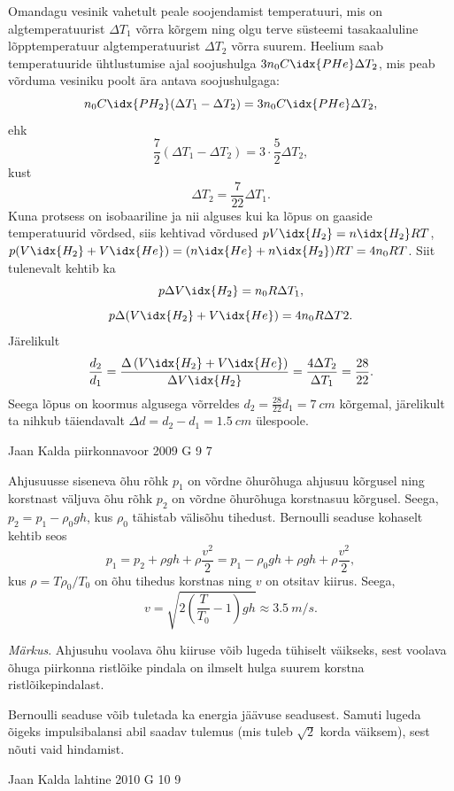 \documentclass[11pt]{article}
\begin{document}
{{Omandagu vesinik vahetult peale soojendamist temperatuuri, mis on algtemperatuurist $\Delta T_1$ võrra kõrgem ning olgu terve süsteemi tasakaaluline lõpptemperatuur algtemperatuurist $\Delta T_2$ võrra suurem. Heelium saab temperatuuride ühtlustumise ajal soojushulga $3n_0C\idx{PHe}\Delta T_2$, mis peab võrduma vesiniku poolt ära antava soojushulgaga:
\[
n_0C\idx{PH_2} (\Delta T_1 - \Delta T_2) = 3n_0C\idx{PHe}\Delta T_2,
\]
ehk
\[
\frac{7}{2} (\Delta T_1 - \Delta T_2) = 3 \cdot \frac{5}{2} \Delta T_2,
\]
kust
\[
\Delta T_2 = \frac{7}{22} \Delta T_1.
\]
Kuna protsess on isobaariline ja nii alguses kui ka lõpus on gaaside temperatuurid võrdsed, siis kehtivad võrdused $pV\idx{H_2} = n\idx{H_2}RT$, $p(V\idx{H_2} + V\idx{He}) = (n\idx{He} + n\idx{H_2} )RT = 4n_0RT$. Siit tulenevalt kehtib ka
\[
p\Delta V\idx{H_2} = n_0R\Delta T_1,
\]
\[
p\Delta (V\idx{H_2} + V\idx{He}) = 4n_0R\Delta T2.
\]
Järelikult
\[
\frac{d_{2}}{d_{1}}=\frac{\Delta\left(V\idx{H_{2}}+V\idx{H e}\right)}{\Delta V\idx{H_{2}}}=\frac{4 \Delta T_{2}}{\Delta T_{1}}=\frac{28}{22}.
\]
Seega lõpus on koormus algusega võrreldes $d_2 = \frac{28}{22} d_1 = \SI{7}{cm}$ kõrgemal, järelikult ta nihkub täiendavalt $\Delta d = d_2 - d_1 = \SI{1,5}{cm}$ ülespoole. 
\fi
}

{Jaan Kalda} %
{piirkonnavoor} %
{2009} %
{G 9} %
{7} %
{

\ifSolution
Ahjusuusse siseneva õhu rõhk $p_1$ on võrdne õhurõhuga ahjusuu kõrgusel ning korstnast väljuva õhu rõhk $p_2$ on võrdne õhurõhuga korstnasuu kõrgusel. Seega, $p_2=p_1-\rho_0 gh$, kus $\rho_0$ tähistab välisõhu tihedust. Bernoulli seaduse kohaselt kehtib seos 
\[
p_1=p_2 + \rho gh + \rho \frac{v^2}{2} = p_1 - \rho_0 gh + \rho gh+\rho \frac{v^2}{2},
\]
kus $\rho=T\rho_0/T_0$ on õhu tihedus korstnas ning $v$ on otsitav kiirus. Seega,
\[
v=\sqrt {2\left(\frac T{T_0}-1\right)gh}\approx \SI{3,5}{m/s}.
\]

\emph{Märkus}. Ahjusuhu voolava õhu kiiruse võib lugeda tühiselt väikseks, sest voolava õhuga piirkonna ristlõike pindala on ilmselt hulga suurem korstna ristlõikepindalast.


Bernoulli seaduse võib tuletada ka energia jäävuse seadusest. Samuti lugeda õigeks impulsibalansi abil saadav tulemus (mis tuleb $\sqrt 2$ korda väiksem), sest nõuti vaid hindamist.
\fi
}

{Jaan Kalda} %
{lahtine} %
{2010} %
{G 10} %
{9} %
{

}}
\end{document}
